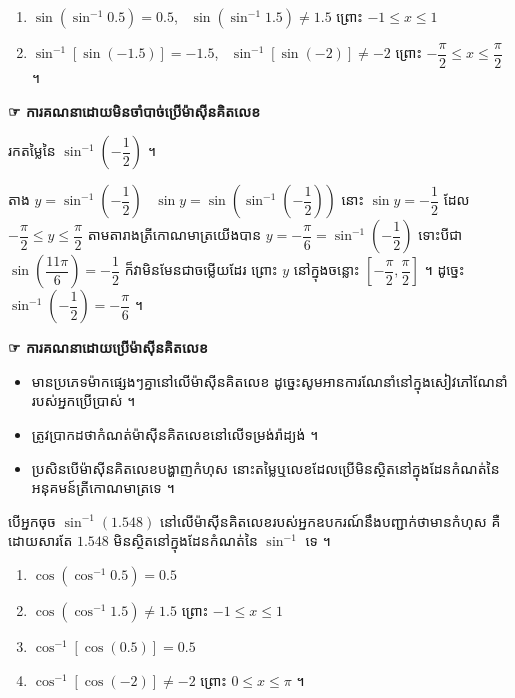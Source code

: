 \begin{example}[ឧទាហរណ៍]
\begin{enumerate}[a]
  \item $\sin(\sin^{-1}0.5) = 0.5$, \ $\sin(\sin^{-1}1.5) \ne 1.5$ ព្រោះ $-1 \le x \le 1$
  \item $\sin^{-1}[\sin(-1.5)] = -1.5$, \ $\sin^{-1}[\sin(-2)] \ne -2$ ព្រោះ $-\dfrac{\pi}{2} \le x \le \dfrac{\pi}{2}$ ។
\end{enumerate}
\end{example}

\textbf{\textcolor{blue!60!black}{☞ ការគណនាដោយមិនចាំបាច់ប្រើម៉ាស៊ីនគិតលេខ}}

\begin{example}[លំហាត់គំរូ ៣]
រកតម្លៃនៃ $\sin^{-1}\left(-\dfrac{1}{2}\right)$ ។
\end{example}
\ans
តាង $y = \sin^{-1}\left(-\dfrac{1}{2}\right)$ \ $\sin y = \sin\left(\sin^{-1}\left(-\dfrac{1}{2}\right)\right)$ នោះ $\sin y = -\dfrac{1}{2}$ ដែល $-\dfrac{\pi}{2} \le y \le \dfrac{\pi}{2}$ តាមតារាងត្រីកោណមាត្រយើងបាន $y = -\dfrac{\pi}{6} = \sin^{-1}\left(-\dfrac{1}{2}\right)$ ទោះបីជា $\sin\left(\dfrac{11\pi}{6}\right) = -\dfrac{1}{2}$ ក៏វាមិនមែនជាចម្លើយដែរ ព្រោះ $y$ នៅក្នុងចន្លោះ $\left[-\dfrac{\pi}{2}, \dfrac{\pi}{2}\right]$ ។ ដូច្នេះ $\sin^{-1}\left(-\dfrac{1}{2}\right) = -\dfrac{\pi}{6}$ ។

\textbf{\textcolor{blue!60!black}{☞ ការគណនាដោយប្រើម៉ាស៊ីនគិតលេខ}}
\begin{itemize}
  \item មានប្រភេទម៉ាកផ្សេងៗគ្នានៅលើម៉ាស៊ីនគិតលេខ ដូច្នេះសូមអានការណែនាំនៅក្នុងសៀវភៅណែនាំរបស់អ្នកប្រើប្រាស់ ។
  \item ត្រូវប្រាកដថាកំណត់ម៉ាស៊ីនគិតលេខនៅលើទម្រង់រ៉ាដ្យង់ ។
  \item ប្រសិនបើម៉ាស៊ីនគិតលេខបង្ហាញកំហុស នោះតម្លៃឬលេខដែលប្រើមិនស្ថិតនៅក្នុងដែនកំណត់នៃអនុគមន៍ត្រីកោណមាត្រទេ ។
\end{itemize}

\begin{example}[ឧទាហរណ៍ ១]
បើអ្នកចុច $\sin^{-1}(1.548)$ នៅលើម៉ាស៊ីនគិតលេខរបស់អ្នកឧបករណ៍នឹងបញ្ជាក់ថាមានកំហុស គឺដោយសារតែ $1.548$ មិនស្ថិតនៅក្នុងដែនកំណត់នៃ $\sin^{-1}$ ទេ ។
\end{example}

\begin{example}[ឧទាហរណ៍ ២]
\begin{enumerate}[a]
  \item $\cos(\cos^{-1}0.5) = 0.5$
  \item $\cos(\cos^{-1}1.5) \ne 1.5$ ព្រោះ $-1 \le x \le 1$
  \item $\cos^{-1}[\cos(0.5)] = 0.5$
  \item $\cos^{-1}[\cos(-2)] \ne -2$ ព្រោះ $0 \le x \le \pi$ ។
\end{enumerate}
\end{example}

